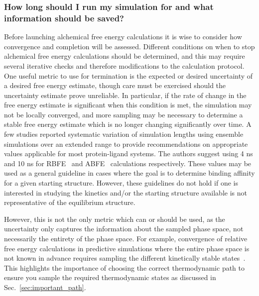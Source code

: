 \documentclass[9pt,bestpractices]{livecoms}
\begin{document}
\subsubsection{How long should I run my simulation for and what information should be saved?}
\label{sec:sim_length_information_kept}
Before launching alchemical free energy calculations it is wise to consider how convergence and completion will be assessed. Different conditions on when to stop alchemical free energy calculations should be determined, and this may require several iterative checks and therefore modifications to the calculation protocol.
One useful metric to use for termination is the expected or desired uncertainty of a desired free energy estimate, though care must be exercised should the uncertainty estimate prove unreliable.
In particular, if the rate of change in the free energy estimate is significant when this condition is met, the simulation may not be locally converged, and more sampling may be necessary to determine a stable free energy estimate which is no longer changing significantly over time. 
A few studies reported systematic variation of simulation lengths using ensemble simulations over an extended range to provide recommendations on appropriate values applicable for most protein-ligand systems. The authors suggest using 4 ns and 10 ns for RBFE~\cite{bhati2017, bhati2022, wan2023eqvsneq} and ABFE~\cite{bhati2025} calculations respectively. These values may be used as a general guideline in cases where the goal is to determine binding affinity for a given starting structure. However, these guidelines do not hold if one is interested in studying the kinetics and/or the starting structure available is not representative of the equilibrium structure.

However, this is not the only metric which can or should be used, as the uncertainty only captures the information about the sampled phase space, not necessarily the entirety of the phase space.  
For example, convergence of relative free energy calculations in predictive simulations where the entire phase space is not known in advance requires sampling the different kinetically stable states~\cite{mobley2012perspective}. 
This highlights the importance of choosing the correct thermodynamic path to ensure you sample the required thermodynamic states as discussed in Sec.~\ref{sec:important_path}.
\end{document}
